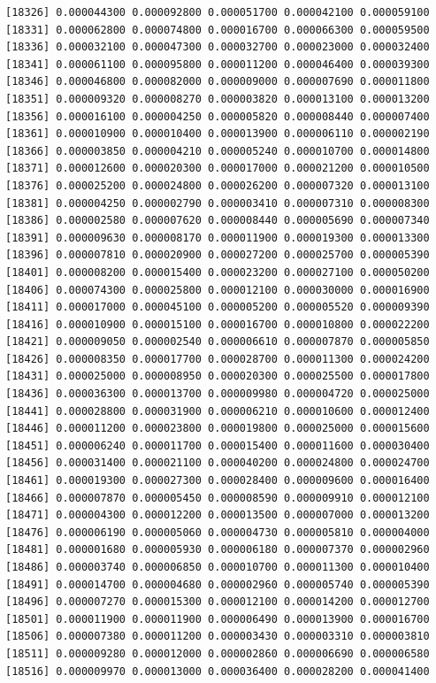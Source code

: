 \documentclass[]{article}
\begin{document}
\begin{verbatim}
[18326] 0.000044300 0.000092800 0.000051700 0.000042100 0.000059100
[18331] 0.000062800 0.000074800 0.000016700 0.000066300 0.000059500
[18336] 0.000032100 0.000047300 0.000032700 0.000023000 0.000032400
[18341] 0.000061100 0.000095800 0.000011200 0.000046400 0.000039300
[18346] 0.000046800 0.000082000 0.000009000 0.000007690 0.000011800
[18351] 0.000009320 0.000008270 0.000003820 0.000013100 0.000013200
[18356] 0.000016100 0.000004250 0.000005820 0.000008440 0.000007400
[18361] 0.000010900 0.000010400 0.000013900 0.000006110 0.000002190
[18366] 0.000003850 0.000004210 0.000005240 0.000010700 0.000014800
[18371] 0.000012600 0.000020300 0.000017000 0.000021200 0.000010500
[18376] 0.000025200 0.000024800 0.000026200 0.000007320 0.000013100
[18381] 0.000004250 0.000002790 0.000003410 0.000007310 0.000008300
[18386] 0.000002580 0.000007620 0.000008440 0.000005690 0.000007340
[18391] 0.000009630 0.000008170 0.000011900 0.000019300 0.000013300
[18396] 0.000007810 0.000020900 0.000027200 0.000025700 0.000005390
[18401] 0.000008200 0.000015400 0.000023200 0.000027100 0.000050200
[18406] 0.000074300 0.000025800 0.000012100 0.000030000 0.000016900
[18411] 0.000017000 0.000045100 0.000005200 0.000005520 0.000009390
[18416] 0.000010900 0.000015100 0.000016700 0.000010800 0.000022200
[18421] 0.000009050 0.000002540 0.000006610 0.000007870 0.000005850
[18426] 0.000008350 0.000017700 0.000028700 0.000011300 0.000024200
[18431] 0.000025000 0.000008950 0.000020300 0.000025500 0.000017800
[18436] 0.000036300 0.000013700 0.000009980 0.000004720 0.000025000
[18441] 0.000028800 0.000031900 0.000006210 0.000010600 0.000012400
[18446] 0.000011200 0.000023800 0.000019800 0.000025000 0.000015600
[18451] 0.000006240 0.000011700 0.000015400 0.000011600 0.000030400
[18456] 0.000031400 0.000021100 0.000040200 0.000024800 0.000024700
[18461] 0.000019300 0.000027300 0.000028400 0.000009600 0.000016400
[18466] 0.000007870 0.000005450 0.000008590 0.000009910 0.000012100
[18471] 0.000004300 0.000012200 0.000013500 0.000007000 0.000013200
[18476] 0.000006190 0.000005060 0.000004730 0.000005810 0.000004000
[18481] 0.000001680 0.000005930 0.000006180 0.000007370 0.000002960
[18486] 0.000003740 0.000006850 0.000010700 0.000011300 0.000010400
[18491] 0.000014700 0.000004680 0.000002960 0.000005740 0.000005390
[18496] 0.000007270 0.000015300 0.000012100 0.000014200 0.000012700
[18501] 0.000011900 0.000011900 0.000006490 0.000013900 0.000016700
[18506] 0.000007380 0.000011200 0.000003430 0.000003310 0.000003810
[18511] 0.000009280 0.000012000 0.000002860 0.000006690 0.000006580
[18516] 0.000009970 0.000013000 0.000036400 0.000028200 0.000041400

\end{verbatim}
\end{document}
